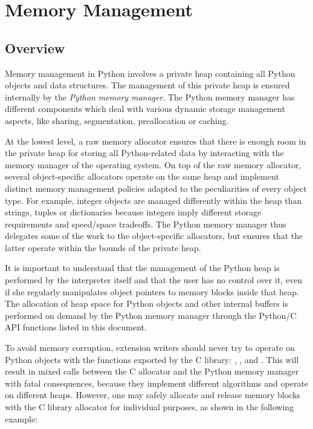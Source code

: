 \chapter{Memory Management \label{memory}}


\section{Overview \label{memoryOverview}}

Memory management in Python involves a private heap containing all
Python objects and data structures. The management of this private
heap is ensured internally by the \emph{Python memory manager}.  The
Python memory manager has different components which deal with various
dynamic storage management aspects, like sharing, segmentation,
preallocation or caching.

At the lowest level, a raw memory allocator ensures that there is
enough room in the private heap for storing all Python-related data
by interacting with the memory manager of the operating system. On top
of the raw memory allocator, several object-specific allocators
operate on the same heap and implement distinct memory management
policies adapted to the peculiarities of every object type. For
example, integer objects are managed differently within the heap than
strings, tuples or dictionaries because integers imply different
storage requirements and speed/space tradeoffs. The Python memory
manager thus delegates some of the work to the object-specific
allocators, but ensures that the latter operate within the bounds of
the private heap.

It is important to understand that the management of the Python heap
is performed by the interpreter itself and that the user has no
control over it, even if she regularly manipulates object pointers to
memory blocks inside that heap.  The allocation of heap space for
Python objects and other internal buffers is performed on demand by
the Python memory manager through the Python/C API functions listed in
this document.

To avoid memory corruption, extension writers should never try to
operate on Python objects with the functions exported by the C
library: ,
,
 and
.  This will result in 
mixed calls between the C allocator and the Python memory manager
with fatal consequences, because they implement different algorithms
and operate on different heaps.  However, one may safely allocate and
release memory blocks with the C library allocator for individual
purposes, as shown in the following example:

